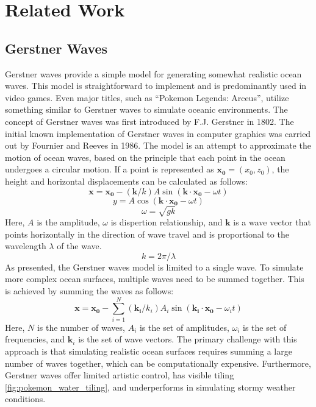 \section{Related Work}

\subsection{Gerstner Waves}
Gerstner waves provide a simple model for generating somewhat realistic ocean waves. This model is straightforward to implement and is predominantly used in video games. Even major titles, such as “Pokemon Legends: Arceus”, utilize something similar to Gerstner waves to simulate oceanic environments.
The concept of Gerstner waves was first introduced by F.J. Gerstner \cite{Franz1809} in 1802. The initial known implementation of Gerstner waves in computer graphics was carried out by Fournier and Reeves \cite{AlainWilliam1986} in 1986. The model is an attempt to approximate the motion of ocean waves, based on the principle that each point in the ocean undergoes a circular motion.
If a point is represented as $\mathbf{x_0} = (x_0, z_0)$, the height and horizontal displacements can be calculated as follows:
\begin{equation}
\mathbf{x} = \mathbf{x_0} - (\mathbf{k} / k) A \sin(\mathbf{k} \cdot \mathbf{x_0} - \omega t)
\end{equation}
\begin{equation}
    y = A \cos(\mathbf{k} \cdot \mathbf{x_0} - \omega t)
\end{equation}
\begin{equation}
    \omega = \sqrt{gk}
\end{equation}
Here, $A$ is the amplitude, $\omega$ is dispertion relationship, and $\mathbf{k}$ is a wave vector that points horizontally in the direction of wave travel and is proportional to the wavelength $\lambda$ of the wave.
\begin{equation}
k = 2 \pi / \lambda
\end{equation}
As presented, the Gerstner waves model is limited to a single wave. To simulate more complex ocean surfaces, multiple waves need to be summed together. This is achieved by summing the waves as follows:
\begin{equation}
\mathbf{x} = \mathbf{x_0} - \sum_{i=1}^{N} (\mathbf{k_i} / k_i) A_i \sin(\mathbf{k_i} \cdot \mathbf{x_0} - \omega_i t)
\end{equation}
Here, $N$ is the number of waves, $A_i$ is the set of amplitudes, $\omega_i$ is the set of frequencies, and $\mathbf{k}_i$ is the set of wave vectors.
The primary challenge with this approach is that simulating realistic ocean surfaces requires summing a large number of waves together, which can be computationally expensive. 
Furthermore, Gerstner waves offer limited artistic control, has visible tiling \ref{fig:pokemon_water_tiling}, and underperforms in simulating stormy weather conditions.

